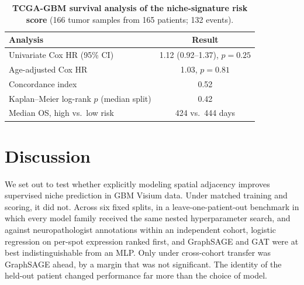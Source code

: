\documentclass[11pt,letterpaper]{article}
\begin{document}
\begin{table}[H]
\centering
\caption{\textbf{TCGA-GBM survival analysis of the niche-signature risk score} (166 tumor samples from 165 patients; 132 events).}
\label{tab:survival}
\small
\begin{tabular}{lc}
\toprule
\textbf{Analysis} & \textbf{Result} \\
\midrule
Univariate Cox HR (95\% CI)        & 1.12 (0.92--1.37), $p = 0.25$ \\
Age-adjusted Cox HR                & 1.03, $p = 0.81$ \\
Concordance index                  & 0.52 \\
Kaplan--Meier log-rank $p$ (median split) & 0.42 \\
Median OS, high vs.\ low risk      & 424 vs.\ 444 days \\
\bottomrule
\end{tabular}
\end{table}

\section{Discussion}

We set out to test whether explicitly modeling spatial adjacency improves supervised niche prediction in GBM Visium data. Under matched training and scoring, it did not. Across six fixed splits, in a leave-one-patient-out benchmark in which every model family received the same nested hyperparameter search, and against neuropathologist annotations within an independent cohort, logistic regression on per-spot expression ranked first, and GraphSAGE and GAT were at best indistinguishable from an MLP. Only under cross-cohort transfer was GraphSAGE ahead, by a margin that was not significant. The identity of the held-out patient changed performance far more than the choice of model.
\end{document}
